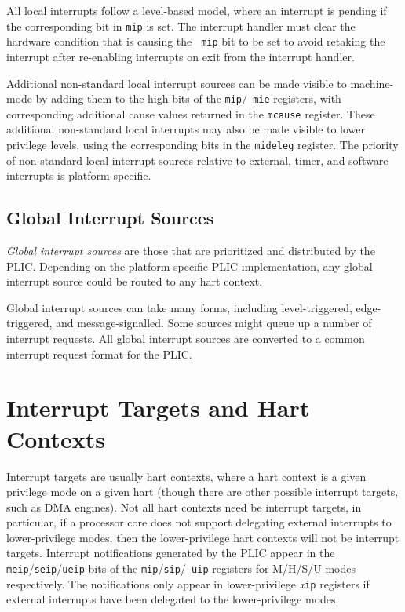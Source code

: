 All local interrupts follow a level-based model, where an interrupt is
pending if the corresponding bit in {\tt mip} is set.  The interrupt
handler must clear the hardware condition that is causing the {\tt
  mip} bit to be set to avoid retaking the interrupt after re-enabling
interrupts on exit from the interrupt handler.

Additional non-standard local interrupt sources can be made visible to
machine-mode by adding them to the high bits of the {\tt mip}/{\tt
  mie} registers, with corresponding additional cause values returned
in the {\tt mcause} register.  These additional non-standard local
interrupts may also be made visible to lower privilege levels, using
the corresponding bits in the {\tt mideleg} register.  The priority of
non-standard local interrupt sources relative to external, timer, and
software interrupts is platform-specific.

\subsection{Global Interrupt Sources}

{\em Global interrupt sources} are those that are prioritized and
distributed by the PLIC.  Depending on the platform-specific PLIC
implementation, any global interrupt source could be routed to any
hart context.

Global interrupt sources can take many forms, including
level-triggered, edge-triggered, and message-signalled.  Some sources
might queue up a number of interrupt requests.  All global interrupt
sources are converted to a common interrupt request format for the
PLIC.

\section{Interrupt Targets and Hart Contexts}

Interrupt targets are usually hart contexts, where a hart context is a
given privilege mode on a given hart (though there are other possible
interrupt targets, such as DMA engines).  Not all hart contexts need
be interrupt targets, in particular, if a processor core does not
support delegating external interrupts to lower-privilege modes, then
the lower-privilege hart contexts will not be interrupt targets.
Interrupt notifications generated by the PLIC appear in the {\tt
  meip}/{\tt seip}/{\tt ueip} bits of the {\tt mip}/{\tt sip}/{\tt
  uip} registers for M/H/S/U modes respectively.  The notifications
only appear in lower-privilege {\em x}{\tt ip} registers if external
interrupts have been delegated to the lower-privilege modes.

